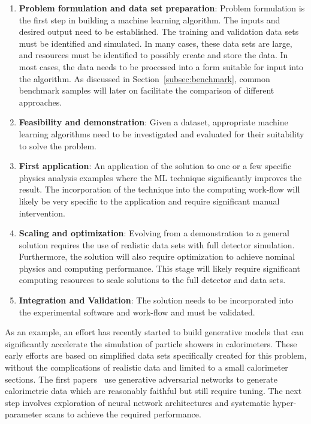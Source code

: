 \begin{enumerate}
 \item \textbf{Problem formulation and data set preparation}: Problem formulation is the first step in building a machine learning algorithm. The inputs and desired output need to be established. The training and validation data sets must be identified and simulated. In many cases, these data sets are large, and resources must be identified to possibly create and store the data. In most cases, the data needs to be processed into a form suitable for input into the algorithm. As discussed in Section~\ref{subsec:benchmark}, common benchmark samples will later on facilitate the comparison of different approaches.
 \item \textbf{Feasibility and demonstration}: Given a dataset, appropriate machine learning algorithms need to be investigated and evaluated for their suitability to solve the problem.
 \item \textbf{First application}: An application of the solution to one or a few specific physics analysis examples where the ML technique significantly improves the result. The incorporation of the technique into the computing work-flow will likely be very specific to the application and require significant manual intervention.
 \item \textbf{Scaling and optimization}: Evolving from a demonstration to a general solution requires the use of realistic data sets with full detector simulation. Furthermore, the solution will also require optimization to achieve nominal physics and computing performance. This stage will likely require significant computing resources to scale solutions to the full detector and data sets.
 \item \textbf{Integration and Validation}: The solution needs to be incorporated into the experimental software and work-flow and must be validated.
\end{enumerate}

As an example, an effort has recently started to build generative models that can significantly accelerate the simulation of particle showers in calorimeters.
These early efforts are based on simplified data sets specifically created for this problem, without the complications of realistic data and limited to a small calorimeter sections.
The first papers~\cite{Paganini:2017hrr} use generative adversarial networks to generate calorimetric data which are reasonably faithful but still require tuning. The next step involves exploration of neural network architectures and systematic hyper-parameter scans to achieve the required performance.\\

